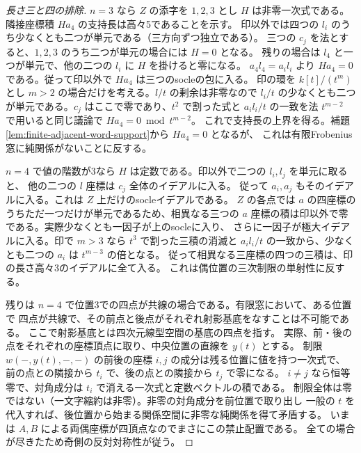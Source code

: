 \begin{proof}[長さ三と四の排除]
$n=3$ なら $Z$ の添字を $1,2,3$ とし $H$ は非零一次式である。
隣接座標積 $H a_4$ の支持長は高々5であることを示す。
印以外では四つの $l_i$ のうち少なくとも二つが単元である（三方向ずつ独立である）。
三つの $c_j$ を法とすると、$1,2,3$ のうち二つが単元の場合には $H=0$ となる。
残りの場合は $l_4$ と一つが単元で、他の二つの $l_i$ に $H$ を掛けると零になる。
$a_4 l_4=a_i l_i$ より $H a_4=0$ である。従って印以外で $H a_4$ は三つのsocleの包に入る。
印の環を $k[t]/(t^m)$ とし $m>2$ の場合だけを考える。$l/t$ の剰余は非零なので
$l_i/t$ の少なくとも二つが単元である。$c_j$ はここで零であり、$t^2$ で割った式と
$a_i l_i/t$ の一致を法 $t^{m-2}$ で用いると同じ議論で $Ha_4=0\bmod t^{m-2}$。
これで支持長の上界を得る。補題\ref{lem:finite-adjacent-word-support}から $Ha_4=0$ となるが、
これは有限Frobenius窓に純関係がないことに反する。

$n=4$ で値の階数が3なら $H$ は定数である。印以外で二つの $l_i,l_j$ を単元に取ると、
他の二つの $l$ 座標は $c_j$ 全体のイデアルに入る。
従って $a_i,a_j$ もそのイデアルに入る。これは $Z$ 上だけのsocleイデアルである。
$Z$ の各点では $a$ の四座標のうちただ一つだけが単元であるため、相異なる三つの
$a$ 座標の積は印以外で零である。実際少なくとも一因子が上のsocleに入り、
さらに一因子が極大イデアルに入る。印で $m>3$ なら $t^3$ で割った三積の消滅と
$a_i l_i/t$ の一致から、少なくとも二つの $a_i$ は $t^{m-3}$ の倍となる。
従って相異なる三座標の四つの三積は、印の長さ高々3のイデアルに全て入る。
これは偶位置の三次制限の単射性に反する。

残りは $n=4$ で位置3での四点が共線の場合である。有限窓において、ある位置で
四点が共線で、その前点と後点がそれぞれ射影基底をなすことは不可能である。
ここで射影基底とは四次元線型空間の基底の四点を指す。
実際、前・後の点をそれぞれの座標頂点に取り、中央位置の直線を $y(t)$ とする。
制限 $w(-,y(t),-,-)$ の前後の座標 $i,j$ の成分は残る位置に値を持つ一次式で、
前の点との隣接から $t_i$ で、後の点との隣接から $t_j$ で零になる。
$i\ne j$ なら恒等零で、対角成分は $t_i$ で消える一次式と定数ベクトルの積である。
制限全体は零ではない（一文字縮約は非零）。非零の対角成分を前位置で取り出し
一般の $t$ を代入すれば、後位置から始まる関係空間に非零な純関係を得て矛盾する。
いまは $A,B$ による両偶座標が四頂点なのでまさにこの禁止配置である。
全ての場合が尽きたため奇側の反対対称性が従う。
\end{proof}
